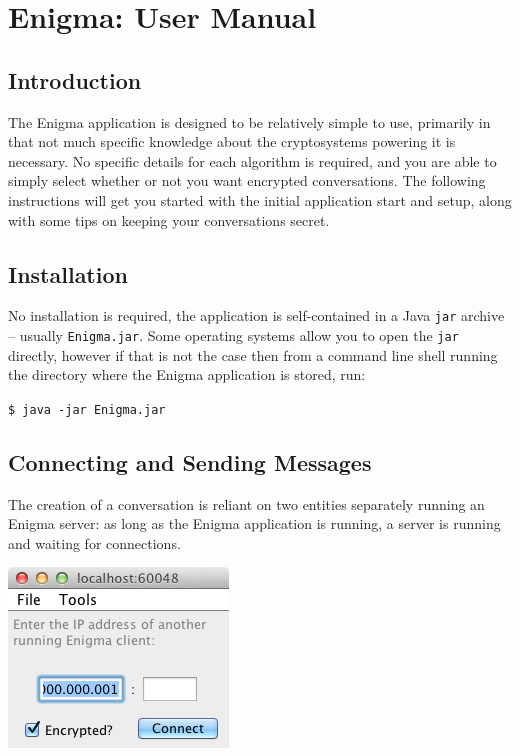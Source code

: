 
\chapter{Enigma: User Manual}
\label{AppendixD}

\section{Introduction}

The Enigma application is designed to be relatively simple to use, primarily in that not much specific knowledge about the cryptosystems powering it is necessary. No specific details for each algorithm is required, and you are able to simply select whether or not you want encrypted conversations. The following instructions will get you started with the initial application start and setup, along with some tips on keeping your conversations secret.

\section{Installation}

No installation is required, the application is self-contained in a Java \verb!jar! archive -- usually \verb!Enigma.jar!. Some operating systems allow you to open the \verb!jar! directly, however if that is not the case then from a command line shell running the directory where the Enigma application is stored, run:

\begin{center}
  \verb!$ java -jar Enigma.jar!
\end{center}

\section{Connecting and Sending Messages}

The creation of a conversation is reliant on two entities separately running an Enigma server: as long as the Enigma application is running, a server is running and waiting for connections.

\begin{center}
  \includegraphics[scale=0.6]{./Figures/AppD/D-3.png}
\end{center}

